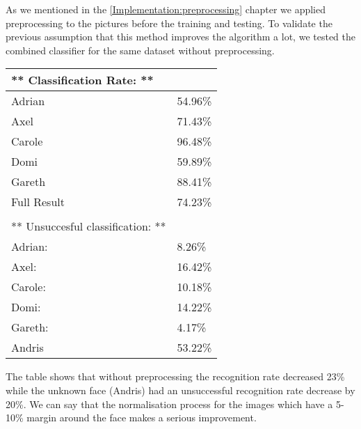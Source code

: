 As we mentioned in the \ref{Implementation:preprocessing} chapter we applied preprocessing to the pictures before the training and testing. To validate the previous assumption that this method improves the algorithm a lot, we tested the combined classifier for the same dataset without preprocessing.

\begin{table}[h]
	\begin{tabular}{ll}
		\multicolumn{1}{l|}{** Classification Rate:                **} &         \\ \hline
		\multicolumn{1}{l|}{Adrian}                                    & 54.96\% \\
		\multicolumn{1}{l|}{Axel}                                      & 71.43\% \\
		\multicolumn{1}{l|}{Carole}                                    & 96.48\% \\
		\multicolumn{1}{l|}{Domi}                                      & 59.89\% \\
		\multicolumn{1}{l|}{Gareth}                                    & 88.41\% \\
		\multicolumn{1}{l|}{Full Result}                               & 74.23\% \\
		&         \\
		\multicolumn{1}{l|}{** Unsuccesful classification:         **} &         \\ \hline
		\multicolumn{1}{l|}{Adrian:}                                   & 8.26\%  \\
		\multicolumn{1}{l|}{Axel:}                                     & 16.42\% \\
		\multicolumn{1}{l|}{Carole:}                                   & 10.18\% \\
		\multicolumn{1}{l|}{Domi:}                                     & 14.22\% \\
		\multicolumn{1}{l|}{Gareth:}                                   & 4.17\%  \\ \hline
		\multicolumn{1}{l|}{Andris}                                    & 53.22\%
	\end{tabular}
\end{table}

 The table shows that without preprocessing the recognition rate decreased 23\% while the unknown face (Andris) had an unsuccessful recognition rate decrease by 20\%. We can say that the normalisation process for the images which have a 5-10\% margin around the face makes a serious improvement.